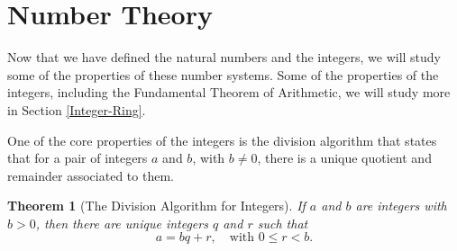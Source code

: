\documentclass[
]{book}
\let\stdsection\section
\renewcommand\section{\newpage\stdsection}
\newtheorem{theorem}{Theorem}[chapter]
\theoremstyle{definition}
\theoremstyle{definition}
\theoremstyle{definition}
\theoremstyle{definition}
\theoremstyle{remark}
\begin{document}
\hypertarget{numbertheory}{%
\section{Number Theory}\label{numbertheory}}

Now that we have defined the natural numbers and the integers, we will study some of the properties of these number systems. Some of the properties of the integers, including the Fundamental Theorem of Arithmetic, we will study more in Section \ref{Integer-Ring}.

One of the core properties of the integers is the division algorithm that states that for a pair of integers \(a\) and \(b\), with \(b\neq 0\), there is a unique quotient and remainder associated to them.

\begin{theorem}[The Division Algorithm for Integers]
\protect\hypertarget{thm:division-algorithm1}{}\label{thm:division-algorithm1}If \(a\) and \(b\) are integers with \(b>0\), then there are unique integers \(q\) and \(r\) such that \[a=bq+r, \quad \mbox{with } 0\leq r <b.\]
\end{theorem}
\end{document}
